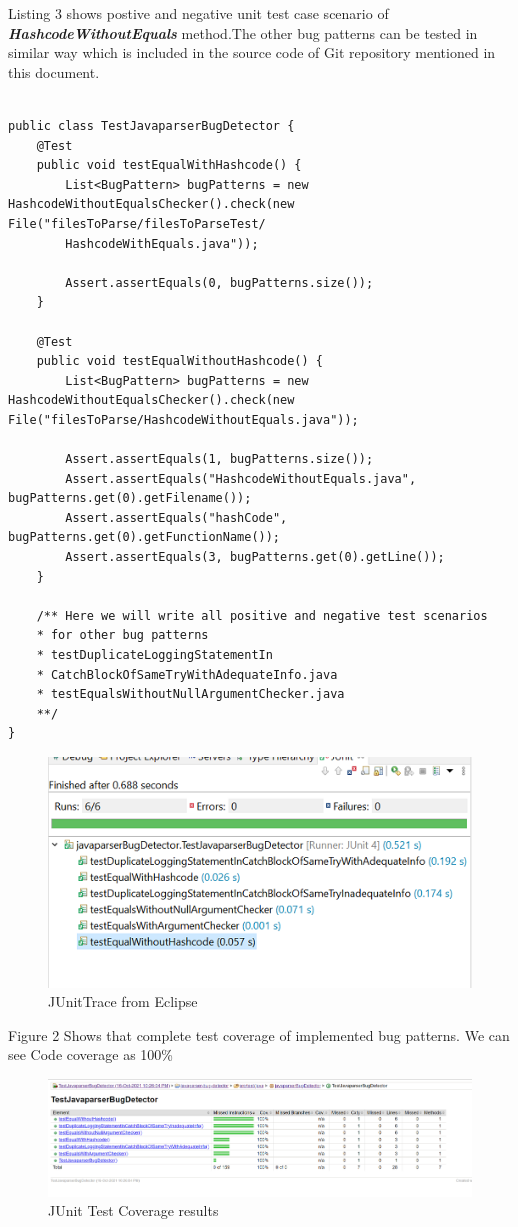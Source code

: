 \documentclass[sigplan,screen]{acmart}
\begin{document}
Listing 3 shows postive and negative unit test case scenario of \textbf{\emph{HashcodeWithoutEquals}} method.The other bug patterns can be tested in similar way which is included in the source code of Git repository mentioned in this document.
\begin{lstlisting}[caption={Test case Scenarios for all the three bug patterns TestJavaparserBugDetector.java},captionpos=b]

public class TestJavaparserBugDetector {
	@Test
	public void testEqualWithHashcode() {
        List<BugPattern> bugPatterns = new HashcodeWithoutEqualsChecker().check(new File("filesToParse/filesToParseTest/
        HashcodeWithEquals.java"));

		Assert.assertEquals(0, bugPatterns.size());
	}

	@Test
	public void testEqualWithoutHashcode() {
		List<BugPattern> bugPatterns = new HashcodeWithoutEqualsChecker().check(new File("filesToParse/HashcodeWithoutEquals.java"));

		Assert.assertEquals(1, bugPatterns.size());
		Assert.assertEquals("HashcodeWithoutEquals.java", bugPatterns.get(0).getFilename());
		Assert.assertEquals("hashCode", bugPatterns.get(0).getFunctionName());
		Assert.assertEquals(3, bugPatterns.get(0).getLine());
	}
        
	/** Here we will write all positive and negative test scenarios
    * for other bug patterns
    * testDuplicateLoggingStatementIn
    * CatchBlockOfSameTryWithAdequateInfo.java
    * testEqualsWithoutNullArgumentChecker.java
    **/
}
\end{lstlisting}
\begin{figure}[H]
    \centering
    \includegraphics[width=0.7\columnwidth]{JUnit Trace.png}
    \caption{JUnitTrace from Eclipse}
    \label{fig:JunitTest}
\end{figure}

Figure 2 Shows that complete test coverage of implemented bug patterns. We can see Code coverage as 100\%
\begin{figure}[H]
    \centering
    \includegraphics[width=0.7\columnwidth]{code coverage.png}
    \caption{JUnit Test Coverage results}
    \label{fig:Code Coverage}
\end{figure}
\end{document}
